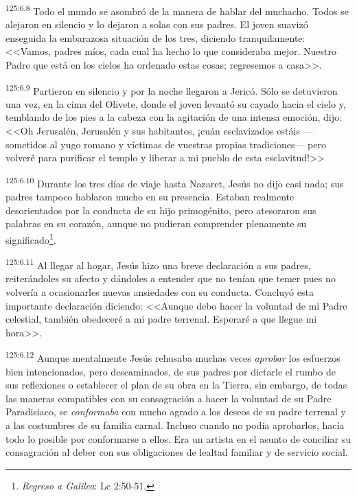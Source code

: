 \par 
\textsuperscript{125:6.8} Todo el mundo se asombró de la manera de hablar del muchacho. Todos se alejaron en silencio y lo dejaron a solas con sus padres. El joven suavizó enseguida la embarazosa situación de los tres, diciendo tranquilamente: <<Vamos, padres míos, cada cual ha hecho lo que consideraba mejor. Nuestro Padre que está en los cielos ha ordenado estas cosas; regresemos a casa>>.

\par 
\textsuperscript{125:6.9} Partieron en silencio y por la noche llegaron a Jericó. Sólo se detuvieron una vez, en la cima del Olivete, donde el joven levantó su cayado hacia el cielo y, temblando de los pies a la cabeza con la agitación de una intensa emoción, dijo: <<Oh Jerusalén, Jerusalén y sus habitantes, ¡cuán esclavizados estáis ---sometidos al yugo romano y víctimas de vuestras propias tradiciones--- pero volveré para purificar el templo y liberar a mi pueblo de esta esclavitud!>>

\par 
\textsuperscript{125:6.10} Durante los tres días de viaje hasta Nazaret, Jesús no dijo casi nada; sus padres tampoco hablaron mucho en su presencia. Estaban realmente desorientados por la conducta de su hijo primogénito, pero atesoraron sus palabras en su corazón, aunque no pudieran comprender plenamente su significado\footnote{\textit{Regreso a Galilea}: Lc 2:50-51.}.

\par 
\textsuperscript{125:6.11} Al llegar al hogar, Jesús hizo una breve declaración a sus padres, reiterándoles su afecto y dándoles a entender que no tenían que temer pues no volvería a ocasionarles nuevas ansiedades con su conducta. Concluyó esta importante declaración diciendo: <<Aunque debo hacer la voluntad de mi Padre celestial, también obedeceré a mi padre terrenal. Esperaré a que llegue mi hora>>.

\par 
\textsuperscript{125:6.12} Aunque mentalmente Jesús rehusaba muchas veces \textit{aprobar} los esfuerzos bien intencionados, pero descaminados, de sus padres por dictarle el rumbo de sus reflexiones o establecer el plan de su obra en la Tierra, sin embargo, de todas las maneras compatibles con su consagración a hacer la voluntad de su Padre Paradisiaco, se \textit{conformaba} con mucho agrado a los deseos de su padre terrenal y a las costumbres de su familia carnal. Incluso cuando no podía aprobarlos, hacía todo lo posible por conformarse a ellos. Era un artista en el asunto de conciliar su consagración al deber con sus obligaciones de lealtad familiar y de servicio social.


